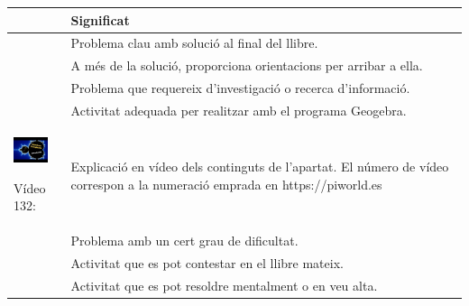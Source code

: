 \cleartorightpage
 

\vspace*{2cm} 

\begin{center}
	\renewcommand{\arraystretch}{1.5}
	\begin{longtable}[h]{>{\raggedleft\arraybackslash}p{}|p{}}
		{\bfseries Símbol} & {\bfseries Significat} \\ \hline
		
		\simbolclau & Problema clau amb solució al final del llibre.  \\ \hline
		
		\simbolcompass & A més de la solució, proporciona orientacions per arribar a ella.  \\ \hline
		
		\simbolsearch & Problema que requereix d'investigació o recerca d'informació.  \\ \hline
		
		\ggb & Activitat adequada per realitzar amb el programa Geogebra.  \\ \hline
		
		\begin{center}\includegraphics[width=1cm]{img-00/video-164}\par {\footnotesize Vídeo 132:}\end{center} & Explicació en vídeo dels continguts de l'apartat. El número de vídeo correspon a la numeració emprada en https://piworld.es 
		
		\\ \hline
		\hot[2] & Problema amb un cert grau de dificultat. \\ [0.25cm] \hline
		\spen & Activitat que es pot contestar en el llibre mateix. \\ [0.25cm] \hline 
		\mental & Activitat que es pot resoldre mentalment o en veu alta.
	\end{longtable}
\end{center}
\vspace{1cm} 


